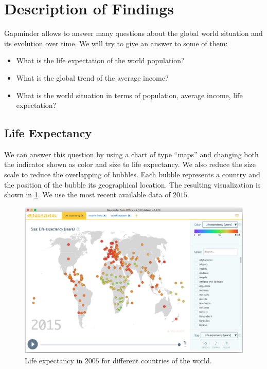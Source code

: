\section{Description of Findings}
\label{sec:findings}

Gapminder allows to answer many questions about the global world situation and its evolution over time.
We will try to give an answer to some of them:
\begin{itemize}
    \item What is the life expectation of the world population?
    \item What is the global trend of the average income?    
    \item What is the world situation in terms of population, average income, life expectation?
\end{itemize}


\subsection{Life Expectancy}
We can answer this question by using a chart of type ``maps'' and changing both the indicator shown as color and size to life expectancy.
We also reduce the size scale to reduce the overlapping of bubbles.
Each bubble represents a country and the position of the bubble its geographical location.
The resulting visualization is shown in \cref{fig:life-expectation}.
We use the most recent available data of $2015$.

\begin{figure}[h]
	\centering
	\includegraphics[width=0.95\columnwidth]{figures/life-expectancy}
	\caption{Life expectancy in $2005$ for different countries of the world.}
	\label{fig:life-expectation}
\end{figure}

